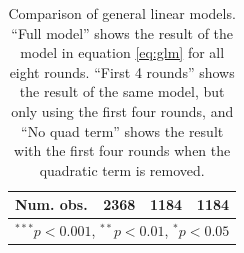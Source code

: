 \begin{table}[h]
\begin{center}
\begin{tabular}{l c c c }
Num. obs.               & 2368                      & 1184                      & 1184                      \\
\hline
\multicolumn{4}{l}{\scriptsize{$^{***}p<0.001$, $^{**}p<0.01$, $^*p<0.05$}}
\end{tabular}
\caption{Comparison of general linear models. ``Full model'' shows the result of the model in equation \eqref{eq:glm} for all eight rounds. ``First 4 rounds'' shows the result of the same model, but only using the first four rounds, and ``No quad term'' shows the result with the first four rounds when the quadratic term is removed. }
\label{tab:1}
\end{center}
\end{table}


